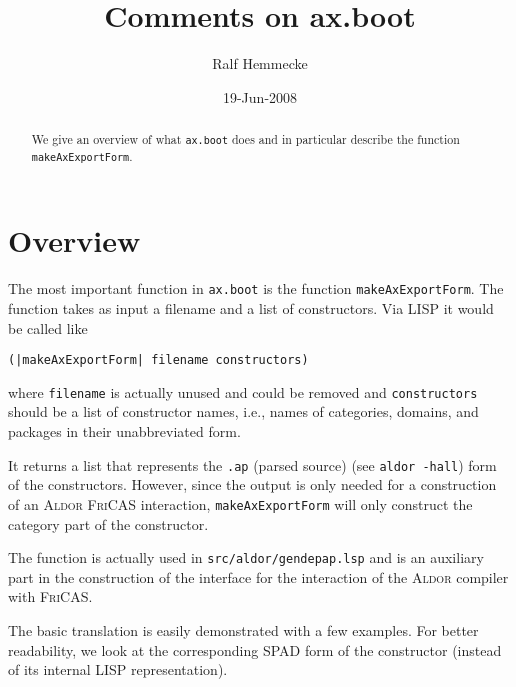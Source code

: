 \documentclass{article}
\newcommand{\file}[1]{\texttt{#1}}
\newcommand{\xAldor}{\textsc{Aldor}}
\newcommand{\xFriCAS}{\textsc{FriCAS}}
\begin{document}
\title{Comments on ax.boot}
\author{Ralf Hemmecke}
\date{19-Jun-2008}
\maketitle
\begin{abstract}
  We give an overview of what \file{ax.boot} does and in particular
  describe the function \verb'makeAxExportForm'.
\end{abstract}
\tableofcontents

\section{Overview}
The most important function in \file{ax.boot} is the function
\verb'makeAxExportForm'.
%
The function takes as input a filename and a list of constructors.
Via LISP it would be called like
\begin{verbatim}
(|makeAxExportForm| filename constructors)
\end{verbatim}
where \verb'filename' is actually unused and could be removed and
\verb'constructors' should be a list of constructor names, i.e., names
of categories, domains, and packages in their unabbreviated form.

It returns a list that represents the \texttt{.ap} (parsed source)
(see \verb'aldor -hall') form of the constructors. However, since the
output is only needed for a construction of an \xAldor{} \xFriCAS{}
interaction, \verb'makeAxExportForm' will only construct the category
part of the constructor.

The function is actually used in \file{src/aldor/gendepap.lsp} and is an
auxiliary part in the construction of the interface for the
interaction of the \xAldor{} compiler with \xFriCAS{}.



The basic translation is easily demonstrated with a few examples. For
better readability, we look at the corresponding SPAD form of the
constructor (instead of its internal LISP representation).
\end{document}
